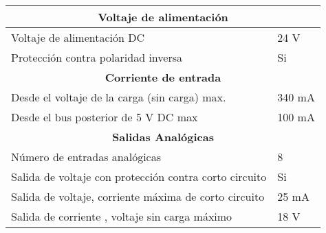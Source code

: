 \begin{table}[ht]
\centering
\begin{tabular}{|l|l|}
\hline
\multicolumn{2}{|c|}{\textbf{Voltaje de alimentación}}                                                                                                                            \\ \hline
Voltaje de alimentación DC                                                                  & 24 V                                                                               \\ \hline
Protección contra polaridad inversa                                                         & Si                                                                                 \\ \hline
\multicolumn{2}{|c|}{\textbf{Corriente de entrada}}                                                                                                                              \\ \hline
Desde el voltaje de la carga (sin carga) max.                                               & 340 mA                                                                             \\ \hline
Desde el bus posterior de 5 V DC max                                                        & 100 mA                                                                             \\ \hline
\multicolumn{2}{|c|}{\textbf{Salidas Analógicas}}                                                                                                                                \\ \hline
Número de entradas analógicas                                                               & 8                                                                                  \\ \hline
Salida de voltaje con protección contra corto circuito                                      & Si                                                                                 \\ \hline
Salida de voltaje, corriente máxima de corto circuito                                       & 25 mA                                                                              \\ \hline
Salida de corriente , voltaje sin carga máximo                                              & 18 V                                                                               \\ \hline

\end{tabular}
\end{table}
